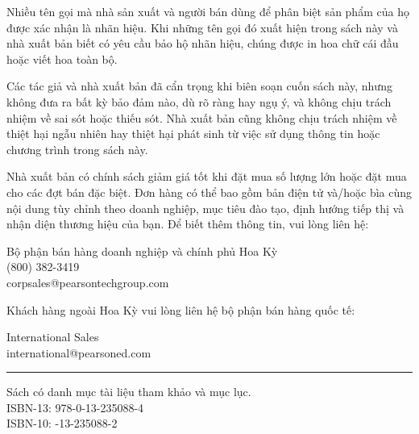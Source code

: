 \documentclass[10pt,twoside,openright]{book}
\begin{document}
\clearpage
\thispagestyle{empty}
\begingroup
\fontsize{8.5}{10.5}\selectfont
\setlength{\parindent}{0pt}
\noindent Nhiều tên gọi mà nhà sản xuất và người bán dùng để phân biệt sản phẩm
của họ được xác nhận là nhãn hiệu. Khi những tên gọi đó xuất hiện trong sách
này và nhà xuất bản biết có yêu cầu bảo hộ nhãn hiệu, chúng được in hoa chữ cái
đầu hoặc viết hoa toàn bộ.\par
\vspace{5pt}
\noindent Các tác giả và nhà xuất bản đã cẩn trọng khi biên soạn cuốn sách này,
nhưng không đưa ra bất kỳ bảo đảm nào, dù rõ ràng hay ngụ ý, và không chịu trách
nhiệm về sai sót hoặc thiếu sót. Nhà xuất bản cũng không chịu trách nhiệm về
thiệt hại ngẫu nhiên hay thiệt hại phát sinh từ việc sử dụng thông tin hoặc
chương trình trong sách này.\par
\vspace{5pt}
\noindent Nhà xuất bản có chính sách giảm giá tốt khi đặt mua số lượng lớn hoặc
đặt mua cho các đợt bán đặc biệt. Đơn hàng có thể bao gồm bản điện tử và/hoặc
bìa cùng nội dung tùy chỉnh theo doanh nghiệp, mục tiêu đào tạo, định hướng
tiếp thị và nhận diện thương hiệu của bạn. Để biết thêm thông tin, vui lòng
liên hệ:\par
\vspace{3pt}
\hspace*{20pt}Bộ phận bán hàng doanh nghiệp và chính phủ Hoa Kỳ\\
\hspace*{20pt}(800) 382-3419\\
\hspace*{20pt}corpsales@pearsontechgroup.com\par
\vspace{5pt}
\noindent Khách hàng ngoài Hoa Kỳ vui lòng liên hệ bộ phận bán hàng quốc tế:\par
\vspace{3pt}
\hspace*{20pt}International Sales\\
\hspace*{20pt}international@pearsoned.com\par
\vspace{16pt}
\noindent\rule{\textwidth}{0.5pt}\par
\vfill
\noindent Sách có danh mục tài liệu tham khảo và mục lục.\\
ISBN-13: 978-0-13-235088-4\\
ISBN-10: -13-235088-2\par
\end{document}
